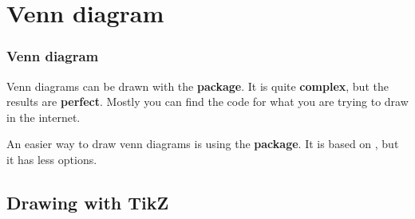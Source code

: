 \section{Venn diagram}

\begin{frame}[fragile]
\frametitle{Venn diagram}

Venn diagrams can be drawn with the \textbf{ package}. It is quite \textbf{complex}, but the results are \textbf{perfect}. Mostly you can find the code for what you are trying to draw in the internet.

\bigskip

An easier way to draw venn diagrams is using the \textbf{ package}. It is based on , but it has less options.


\end{frame}


\subsection{Drawing with TikZ}


